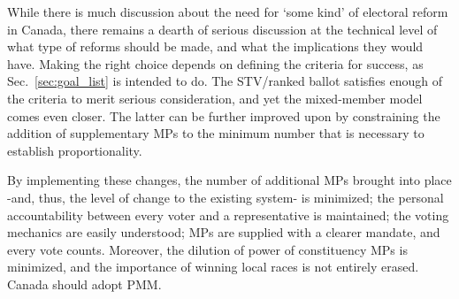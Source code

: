 \documentclass[DIV=calc, paper=a4, fontsize=11pt, twocolumn]{scrartcl}	 %
\begin{document}
While there is much discussion about the need for `some kind' of electoral reform in Canada, there remains a dearth of serious discussion at the technical level of what type of reforms should be made, and what the implications they would have. 
Making the right choice depends on defining the criteria for success, as Sec.~\ref{sec:goal_list} is intended to do.  
The STV/ranked ballot satisfies enough of the criteria to merit serious consideration, and yet the mixed-member model comes even closer. 
The latter can be further improved upon by constraining the addition of supplementary MPs to the minimum number that is necessary to establish proportionality.

By implementing these changes, the number of additional MPs brought into place \--and, thus, the level of change to the existing system\-- is minimized; the  personal accountability between every voter and a representative is maintained; the voting mechanics are easily understood; MPs are supplied with a clearer mandate, and every vote counts. Moreover, the dilution of power of constituency MPs is minimized, and the importance of winning local races is not entirely erased.
Canada should adopt PMM. 

\end{document}
